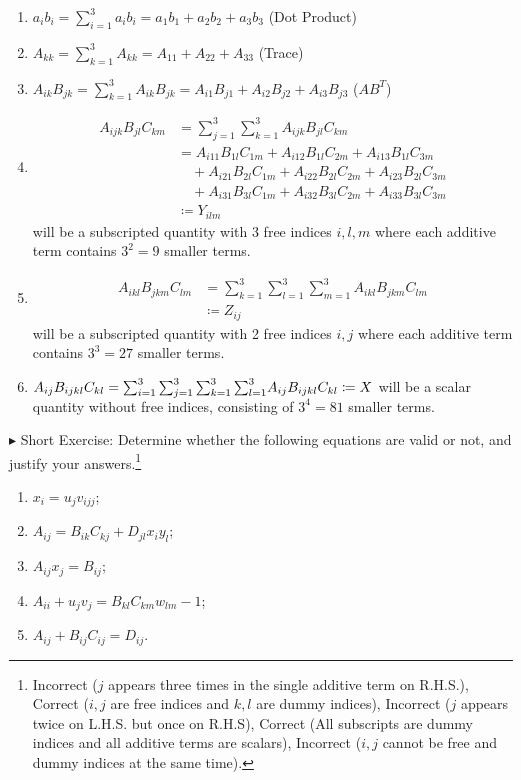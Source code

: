 \begin{enumerate}
    \item $a_ib_i = \sum_{i=1}^3 a_ib_i = a_1b_1 + a_2b_2 + a_3b_3$ (Dot Product)
    \item $A_{kk} = \sum_{k=1}^3 A_{kk} = A_{11} + A_{22} + A_{33}$ (Trace)
    \item $A_{ik}B_{jk} = \sum_{k=1}^3 A_{ik}B_{jk} = A_{i1}B_{j1} + A_{i2}B_{j2} + A_{i3}B_{j3}$ ($AB^T$)
    \item \begin{align*}
    A_{ijk}B_{jl}C_{km} &= \sum_{j=1}^3 \sum_{k=1}^3 A_{ijk}B_{jl}C_{km} \\
    &= A_{i11}B_{1l}C_{1m} + A_{i12}B_{1l}C_{2m} + A_{i13}B_{1l}C_{3m} \\
    &\quad + A_{i21}B_{2l}C_{1m} + A_{i22}B_{2l}C_{2m} + A_{i23}B_{2l}C_{3m} \\
    &\quad + A_{i31}B_{3l}C_{1m} + A_{i32}B_{3l}C_{2m} + A_{i33}B_{3l}C_{3m} \\
    &\coloneq Y_{ilm}
    \end{align*}
    will be a subscripted quantity with 3 free indices $i, l, m$ where each additive term contains $3^2 = 9$ smaller terms.
    \item \begin{align*}
    A_{ikl}B_{jkm}C_{lm} &= \sum_{k=1}^3 \sum_{l=1}^3 \sum_{m=1}^3 A_{ikl}B_{jkm}C_{lm} \\
    &\coloneq Z_{ij}
    \end{align*}
    will be a subscripted quantity with 2 free indices $i, j$ where each additive term contains $3^3 = 27$ smaller terms.
    \item $A_{ij}B_{ijkl}C_{kl} = \smash{\sum_{i=1}^3 \sum_{j=1}^3 \sum_{k=1}^3 \sum_{l=1}^3} A_{ij}B_{ijkl}C_{kl} \coloneq X$ will be a scalar quantity without free indices, consisting of $3^4 = 81$ smaller terms.
\end{enumerate}
$\blacktriangleright$ Short Exercise: Determine whether the following equations are valid or not, and justify your answers.\footnote{Incorrect ($j$ appears three times in the single additive term on R.H.S.), Correct ($i,j$ are free indices and $k,l$ are dummy indices), Incorrect ($j$ appears twice on L.H.S. but once on R.H.S), Correct (All subscripts are dummy indices and all additive terms are scalars), Incorrect ($i,j$ cannot be free and dummy indices at the same time).}
\begin{enumerate}
    \item $x_i = u_jv_{ijj}$;
    \item $A_{ij} = B_{ik}C_{kj} + D_{jl}x_iy_l$;
    \item $A_{ij}x_j = B_{ij}$;
    \item $A_{ii} + u_jv_j = B_{kl}C_{km}w_{lm} - 1$;
    \item $A_{ij} + B_{ij}C_{ij} = D_{ij}$.
\end{enumerate}

